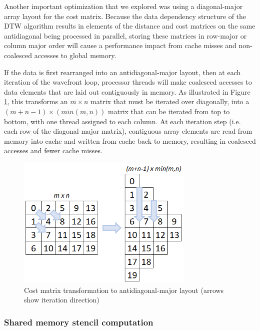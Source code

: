 \documentclass[12pt, letterpaper]{article}
\begin{document}
Another important optimization that we explored was using a diagonal-major array
layout for the cost matrix. Because the data dependency structure of the DTW
algorithm results in elements of the distance and cost matrices on the same
antidiagonal being processed in parallel, storing these matrices in row-major or
column major order will cause a performance impact from cache misses and
non-coalesced accesses to global memory.

If the data is first rearranged into an antidiagonal-major layout, then at each
iteration of the wavefront loop, processor threads will make coalesced accesses
to data elements that are laid out contiguously in memory. As illustrated in
Figure \ref{diagonal_layout}, this transforms an $m \times n$ matrix that must be
iterated over diagonally, into a $(m+n-1) \times (min(m,n))$ matrix that can be
iterated from top to bottom, with one thread assigned to each column. At each
iteration step (i.e. each row of the diagonal-major matrix), contiguous array
elements are read from memory into cache and written from cache back to memory,
resulting in coalesced accesses and fewer cache misses.

\begin{figure}[htbp]
  \includegraphics[height=2.5in]{img/diagonal_layout.png}
  \centering
  \caption{Cost matrix transformation to antidiagonal-major layout (arrows show
    iteration direction)}
  \label{diagonal_layout}
  \end{figure}

\subsubsection{Shared memory stencil computation}
\end{document}
